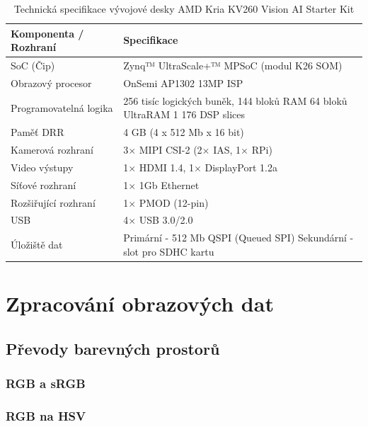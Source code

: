 \begin{table}[htbp]
    \centering
    \caption{Technická specifikace vývojové desky AMD Kria KV260 Vision AI Starter Kit \cite{amd_kv260}}
    \label{tab:kv260-specs}
    \begin{tabular}{@{}ll@{}}
        \toprule
        \textbf{Komponenta / Rozhraní} & \textbf{Specifikace} \\ \midrule
        SoC (Čip) & Zynq™ UltraScale+™ MPSoC (modul K26 SOM) \\
        Obrazový procesor & OnSemi AP1302 13MP ISP\\
        Programovatelná logika & 256 tisíc logických buněk,
144 bloků RAM
64 bloků UltraRAM
1 176 DSP slices\\
        Paměť DRR& 4 GB (4 x 512 Mb x 16 bit)\\
        Kamerová rozhraní & 3$\times$ MIPI CSI-2 (2$\times$ IAS, 1$\times$ RPi) \\
        Video výstupy & 1$\times$ HDMI 1.4, 1$\times$ DisplayPort 1.2a\\
        Síťové rozhraní & 1$\times$ 1Gb Ethernet \\
        Rozšiřující rozhraní & 1$\times$ PMOD (12-pin) \\
        USB & 4$\times$ USB 3.0/2.0 \\
        Úložiště dat & Primární  - 512 Mb QSPI (Queued SPI)
Sekundární - slot pro SDHC kartu\\
    \end{tabular}
\end{table}

\chapter{Zpracování obrazových dat}
\section{Převody barevných prostorů}

\subsection{RGB a sRGB}

\subsection{RGB na HSV}

